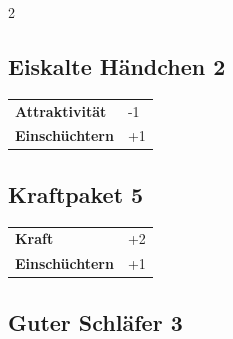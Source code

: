\begin{multicols}{2}
\begin{tcolorbox}

\end{tcolorbox}

\begin{tcolorbox}
    \subsection*{Eiskalte Händchen \hfill \small{2 }}
    \tcblower




\begin{tabular}{@{}ll@{}}
    \textbf{Attraktivität} & -1\\
    \textbf{Einschüchtern} & +1\\
\end{tabular}


\end{tcolorbox}

\begin{tcolorbox}
    \subsection*{Kraftpaket \hfill \small{5 }}
    \tcblower




\begin{tabular}{@{}ll@{}}
    \textbf{Kraft} & +2\\
    \textbf{Einschüchtern} & +1\\
\end{tabular}


\end{tcolorbox}

\begin{tcolorbox}
    \subsection*{Guter Schläfer \hfill \small{3 }}
    \tcblower





\end{tcolorbox}
\end{multicols}
